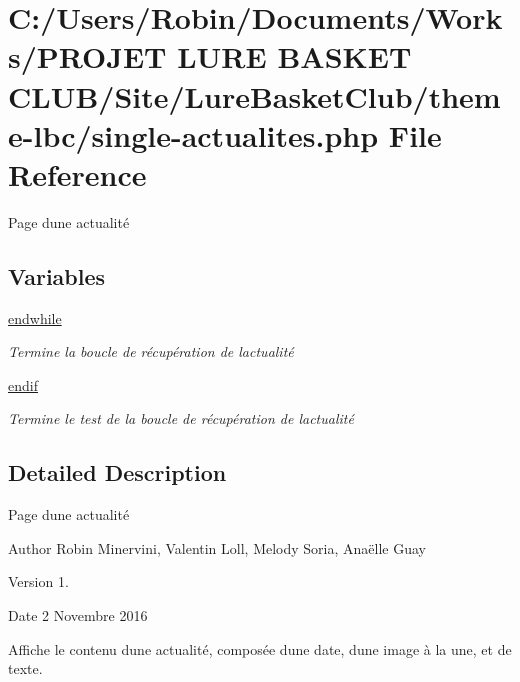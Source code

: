 \hypertarget{single-actualites_8php}{}\section{C\+:/\+Users/\+Robin/\+Documents/\+Works/\+P\+R\+O\+J\+ET L\+U\+RE B\+A\+S\+K\+ET C\+L\+U\+B/\+Site/\+Lure\+Basket\+Club/theme-\/lbc/single-\/actualites.php File Reference}
\label{single-actualites_8php}


Page d\textquotesingle{}une actualité  


\subsection*{Variables}
\begin{DoxyCompactItemize}
\item 
\hyperlink{single-actualites_8php_a1b05dae45f9e3f4c1fe86048550d2c5b}{endwhile}
\begin{DoxyCompactList}\small\item\em Termine la boucle de récupération de l\textquotesingle{}actualité \end{DoxyCompactList}\item 
\hyperlink{single-actualites_8php_a82cd33ca97ff99f2fcc5e9c81d65251b}{endif}
\begin{DoxyCompactList}\small\item\em Termine le test de la boucle de récupération de l\textquotesingle{}actualité \end{DoxyCompactList}\end{DoxyCompactItemize}


\subsection{Detailed Description}
Page d\textquotesingle{}une actualité 

\begin{DoxyAuthor}{Author}
Robin Minervini, Valentin Loll, Melody Soria, Anaëlle Guay 
\end{DoxyAuthor}
\begin{DoxyVersion}{Version}
1. 
\end{DoxyVersion}
\begin{DoxyDate}{Date}
2 Novembre 2016
\end{DoxyDate}
Affiche le contenu d\textquotesingle{}une actualité, composée d\textquotesingle{}une date, d\textquotesingle{}une image à la une, et de texte. 

